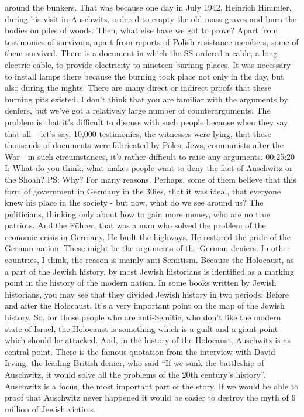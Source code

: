 around the bunkers. That was because one day in July 1942, Heinrich Himmler, during his visit in Auschwitz, ordered to empty the old mass graves and burn the bodies on piles of woods. 
Then, what else have we got to prove? Apart from testimonies of survivors, apart from reports of Polish resistance members, some of them survived. There is a document in which the SS ordered a cable, a long electric cable, to provide electricity to nineteen burning places. It was necessary to install lamps there because the burning took place not only in the day, but also during the nights. There are many direct or indirect proofs that these burning pits existed. I don’t think that you are familiar with the arguments by deniers, but we’ve got a relatively large number of counterarguments. The problem is that it’s difficult to discuss with such people because when they say that all – let’s say, 10,000 testimonies, the witnesses were lying, that these thousands of documents were fabricated by Poles, Jews, communists after the War - in such circumstances, it’s rather difficult to raise any arguments. 00:25:20
I: What do you think, what makes people want to deny the fact of Auschwitz or the Shoah?
PS: Why? For many reasons. Perhaps, some of them believe that this form of government in Germany in the 30ies, that it was ideal, that everyone knew his place in the society - but now, what do we see around us? The politicians, thinking only about how to gain more money, who are no true patriots. And the Führer, that was a man who solved the problem of the economic crisis in Germany. He built the highways. He restored the pride of the German nation. These might be the arguments of the German deniers. In other countries, I think, the reason is mainly anti-Semitism. Because the Holocaust, as a part of the Jewish history, by most Jewish historians is identified as a marking point in the history of the modern nation. In some books written by Jewish historians, you may see that they divided Jewish history in two periods: Before and after the Holocaust. It’s a very important point on the map of the Jewish history. So, for those people who are anti-Semitic, who don’t like the modern state of Israel, the Holocaust is something which is a guilt and a giant point which should be attacked. And, in the history of the Holocaust, Auschwitz is as central point. There is the famous quotation from the interview with David Irving, the leading British denier, who said “If we sunk the battleship of Auschwitz, it would solve all the problems of the 20th century’s history”. Auschwitz is a focus, the most important part of the story. If we would be able to proof that Auschwitz never happened it would be easier to destroy the myth of 6 million of Jewish victims.
